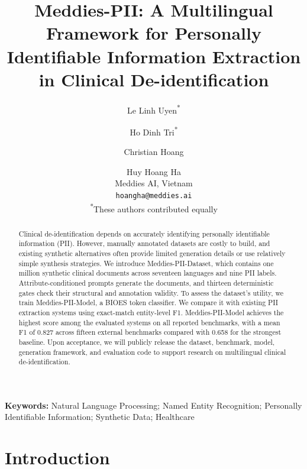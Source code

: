 \documentclass[11pt]{article}
\begin{document}
\title{Meddies-PII: A Multilingual Framework for Personally Identifiable Information Extraction in Clinical De-identification}

\author{
  Le Linh Uyen\textsuperscript{*} \and
  Ho Dinh Tri\textsuperscript{*} \and
  Christian Hoang \and
  Huy Hoang Ha \\
  Meddies AI, Vietnam \\
  \texttt{hoangha@meddies.ai} \\
  \textsuperscript{*}These authors contributed equally
}

\maketitle



\begin{abstract}
Clinical de-identification depends on accurately identifying personally identifiable information (PII). However, manually annotated datasets are costly to build, and existing synthetic alternatives often provide limited generation details or use relatively simple synthesis strategies. We introduce Meddies-PII-Dataset, which contains one million synthetic clinical documents across seventeen languages and nine PII labels. Attribute-conditioned prompts generate the documents, and thirteen deterministic gates check their structural and annotation validity. To assess the dataset's utility, we train Meddies-PII-Model, a BIOES token classifier. We compare it with existing PII extraction systems using exact-match entity-level F1. Meddies-PII-Model achieves the highest score among the evaluated systems on all reported benchmarks, with a mean F1 of 0.827 across fifteen external benchmarks compared with 0.658 for the strongest baseline. Upon acceptance, we will publicly release the dataset, benchmark, model, generation framework, and evaluation code to support research on multilingual clinical de-identification.
\end{abstract}

\noindent\textbf{Keywords:} Natural Language Processing; Named Entity Recognition; Personally Identifiable Information; Synthetic Data; Healthcare\par\medskip

\section{Introduction}
\end{document}
